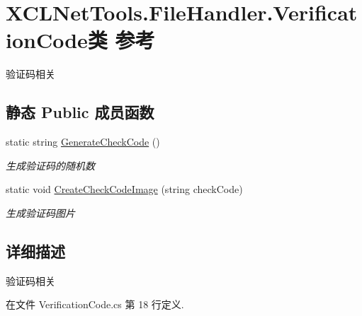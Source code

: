 \hypertarget{class_x_c_l_net_tools_1_1_file_handler_1_1_verification_code}{\section{X\-C\-L\-Net\-Tools.\-File\-Handler.\-Verification\-Code类 参考}
\label{class_x_c_l_net_tools_1_1_file_handler_1_1_verification_code}
}


验证码相关  


\subsection*{静态 Public 成员函数}
\begin{DoxyCompactItemize}
\item 
static string \hyperlink{class_x_c_l_net_tools_1_1_file_handler_1_1_verification_code_af4beced22b07b395e6ae37452a895f32}{Generate\-Check\-Code} ()
\begin{DoxyCompactList}\small\item\em 生成验证码的随机数 \end{DoxyCompactList}\item 
static void \hyperlink{class_x_c_l_net_tools_1_1_file_handler_1_1_verification_code_acde0d83935e0d55da7a29725026a72e9}{Create\-Check\-Code\-Image} (string check\-Code)
\begin{DoxyCompactList}\small\item\em 生成验证码图片 \end{DoxyCompactList}\end{DoxyCompactItemize}


\subsection{详细描述}
验证码相关 



在文件 Verification\-Code.\-cs 第 18 行定义.



